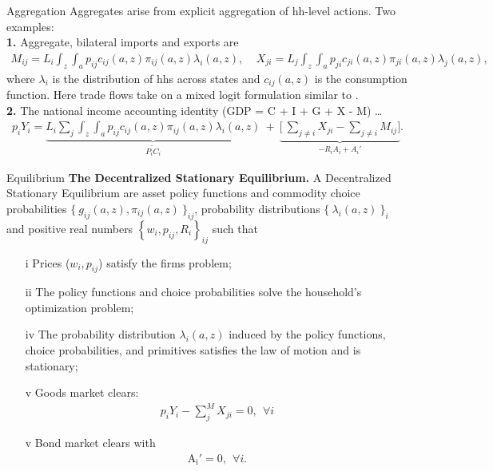 \documentclass[9pt,pdftex,aspectratio=1610]{beamer}
\theoremstyle{definition}
\begin{document}
\begin{frame}[t]{Aggregation}
\smallskip
Aggregates arise from explicit aggregation of hh-level actions. Two examples:\\
\medskip
\medskip
\textbf{1.} Aggregate, bilateral imports and exports are
\begin{align*}
M_{ij} = L_i \int_{z} \int_{a}  p_{ij} c_{ij}(a, z) \pi_{ij}(a, z) \lambda_i(a, z), \ \ \ \ \ X_{ji} = L_j \int_{z} \int_{a}  p_{ji} c_{ji}(a, z) \pi_{ji}(a, z) \lambda_j(a, z),
\end{align*}
where $\lambda_i$ is the distribution of hhs across states and $c_{ij}(a, z)$ is the consumption function. Here trade flows take on a mixed logit formulation similar to \citet*{berry1995automobile}. \\
\bigskip
\bigskip
\textbf{2.} The national income accounting identity (GDP = C + I + G + X - M) \ldots
\begin{align*}
p_{i} Y_{i}  =  \underbrace{L_{i} \sum_{j} \int_{z} \int_{a}  p_{ij} c_{ij}(a, z) \pi_{ij}(a, z) \lambda_i(a, z)}_{\widetilde{P_{i} C_i}} \ + \ \underbrace{\bigg[\ \sum_{j\neq i}X_{ji} -  \sum_{j\neq i}M_{ij} \bigg]}_{-R_{i}A_i + A_{i}'}.
\end{align*}
\end{frame}

\begin{frame}[t]{Equilibrium}
\smallskip
\textbf{The Decentralized Stationary Equilibrium.} A Decentralized Stationary Equilibrium are asset policy functions and commodity choice probabilities $\{\  g_{ij}(a, z), \pi_{ij}(a, z) \ \}_{ij}$, probability distributions $\{ \ \lambda_i(a, z) \ \}_{i}$ and positive real numbers $\left \{w_i, p_{ij}, R_i\right \}_{ij}$ such that
\begin{itemize}
\smallskip
\item[i]  Prices ($w_i, p_{ij}$) satisfy the firms problem;
\item[ii] The policy functions and choice probabilities solve the household's optimization problem;
\item[iv] The probability distribution $\lambda_i(a, z)$ induced by the policy functions, choice probabilities, and primitives satisfies the law of motion and is stationary;
\item[v] Goods market clears:
\begin{align*}
p_{i} Y_{i} - \sum_{j}^{M}  X_{ji} = 0, \ \ \forall i
\end{align*}
\item[v] Bond market clears with
\begin{align*}
\mathrm{A_i'} = 0, \ \ \forall i.
\end{align*}
\end{itemize}
\end{frame}
\end{document}
